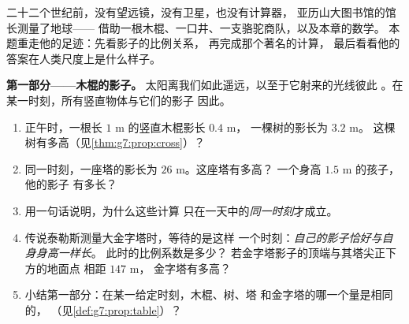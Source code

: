 \begin{problem}
\label{pb:g7:prop:1}
二十二个世纪前，没有望远镜，没有卫星，也没有计算器，
亚历山大图书馆的馆长测量了地球——
借助一根木棍、一口井、一支骆驼商队，以及本章的数学。
本题重走他的足迹：先看影子的比例关系，
再完成那个著名的计算，
最后看看他的答案在人类尺度上是什么样子。

\medskip
\noindent\textbf{第一部分——木棍的影子。}
太阳离我们如此遥远，以至于它射来的光线彼此
。在某一时刻，所有竖直物体与它们的影子
因此。
\begin{enumerate}
  \item 正午时，一根长 $1$ m 的竖直木棍影长 $0.4$ m，
        一棵树的影长为 $3.2$ m。
        这棵树有多高（见\cref{thm:g7:prop:cross}）？
  \item 同一时刻，一座塔的影长为 $26$ m。这座塔有多高？
        一个身高 $1.5$ m 的孩子，他的影子
        有多长？
  \item 用一句话说明，为什么这些计算
        只在一天中的\emph{同一时刻}才成立。
  \item 传说泰勒斯测量大金字塔时，等待的是这样
        一个时刻：\emph{自己的影子恰好与自身身高一样长}。
        此时的比例系数是多少？
        若金字塔影子的顶端与其塔尖正下方的地面点
        相距 $147$ m，
        金字塔有多高？
  \item 小结第一部分：在某一给定时刻，木棍、树、塔
        和金字塔的哪一个量是相同的，
        （见\cref{def:g7:prop:table}）？
\end{enumerate}


\end{problem}
